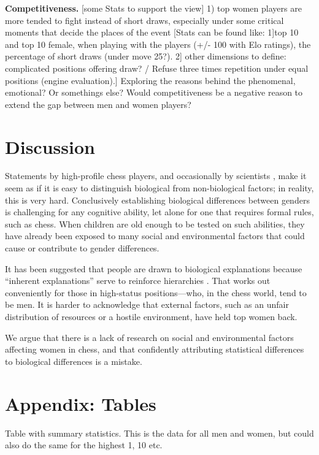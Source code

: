 {\bf Competitiveness.} 
[some Stats to support the view] 1) top women players are more tended to fight instead of short draws, especially under some critical moments that decide the places of the event [Stats can be found like: 1]top 10 and top 10 female, when playing with the players (+/- 100 with Elo ratings), the percentage of short draws (under move 25?).  2] other dimensions to define: complicated positions offering draw? / Refuse three times repetition under equal positions (engine evaluation).]
Exploring the reasons behind the phenomenal, emotional? Or somethings else? Would competitiveness be a negative reason to extend the gap between men and women players?




\section*{Discussion}
Statements by high-profile chess players, and occasionally by scientists \cite{howard2014jbs}, make it seem as if it is easy to  distinguish biological from non-biological factors; in reality, this is very hard. Conclusively establishing biological differences between genders is challenging for any cognitive ability, let alone for one that requires formal rules, such as chess. When children are old enough to be tested on such abilities, they have already been exposed to many social and environmental factors that could cause or contribute to gender differences. 

It has been suggested that people are drawn to biological explanations because ``inherent explanations” serve to reinforce hierarchies \cite{hussak2015early}. That works out conveniently for those in high-status positions—who, in the chess world, tend to be men. It is harder to acknowledge that external factors, such as an unfair distribution of resources or a hostile environment, have held top women back. 

We argue that there is a lack of research on social and environmental factors affecting women in chess, and that confidently attributing statistical differences to biological differences is a mistake.







\section*{Appendix: Tables}
\begin{table*}[]
\centering
\begin{adjustbox}{max width=\textwidth}
    
\end{adjustbox}
\caption{Table with summary statistics. This is the data for all men and women, but could also do the same for the highest 1, 10 etc.}
    \label{tab:summary_statistics_by_federation}
\end{table*}


